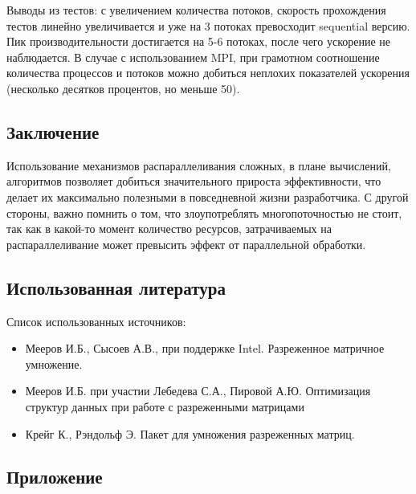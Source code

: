 \documentclass[12pt]{article}
\begin{document}
Выводы из тестов: с увеличением количества потоков, скорость прохождения тестов линейно увеличивается и уже на 3 потоках превосходит sequential версию. Пик производительности достигается на 5-6 потоках, после чего ускорение не наблюдается. В случае с использованием MPI, при грамотном соотношение количества процессов и потоков можно добиться неплохих показателей ускорения (несколько десятков процентов, но меньше 50).
\newpage
\begin{center}
    \section*{Заключение}
\end{center}
Использование механизмов распараллеливания сложных, в плане вычислений, алгоритмов позволяет добиться значительного прироста эффективности, что делает их максимально полезными в повседневной жизни разработчика. С другой стороны, важно помнить о том, что злоупотреблять многопоточностью не стоит, так как в какой-то момент количество ресурсов, затрачиваемых на распараллеливание может превысить эффект от параллельной обработки. 
\newpage
\begin{center}
    \section*{Использованная литература}
\end{center}
Список использованных источников: \\
\begin{itemize}
    \item Мееров И.Б., Сысоев А.В., при поддержке Intel. Разреженное матричное умножение.
    \item Мееров И.Б. при участии Лебедева С.А., Пировой А.Ю. Оптимизация структур данных при работе с разреженными матрицами
    \item Крейг К., Рэндольф Э. Пакет для умножения разреженных матриц.
\end{itemize}
\newpage
\begin{center}
    \section*{Приложение}
\end{center}
\end{document}
